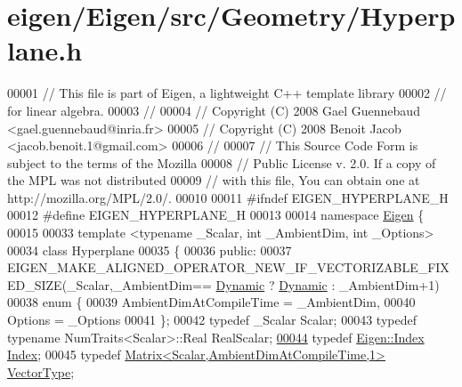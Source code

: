 \hypertarget{eigen_2_eigen_2src_2_geometry_2_hyperplane_8h_source}{}\section{eigen/\+Eigen/src/\+Geometry/\+Hyperplane.h}
\label{eigen_2_eigen_2src_2_geometry_2_hyperplane_8h_source}

\begin{DoxyCode}
00001 \textcolor{comment}{// This file is part of Eigen, a lightweight C++ template library}
00002 \textcolor{comment}{// for linear algebra.}
00003 \textcolor{comment}{//}
00004 \textcolor{comment}{// Copyright (C) 2008 Gael Guennebaud <gael.guennebaud@inria.fr>}
00005 \textcolor{comment}{// Copyright (C) 2008 Benoit Jacob <jacob.benoit.1@gmail.com>}
00006 \textcolor{comment}{//}
00007 \textcolor{comment}{// This Source Code Form is subject to the terms of the Mozilla}
00008 \textcolor{comment}{// Public License v. 2.0. If a copy of the MPL was not distributed}
00009 \textcolor{comment}{// with this file, You can obtain one at http://mozilla.org/MPL/2.0/.}
00010 
00011 \textcolor{preprocessor}{#ifndef EIGEN\_HYPERPLANE\_H}
00012 \textcolor{preprocessor}{#define EIGEN\_HYPERPLANE\_H}
00013 
00014 \textcolor{keyword}{namespace }\hyperlink{namespace_eigen}{Eigen} \{ 
00015 
00033 \textcolor{keyword}{template} <\textcolor{keyword}{typename} \_Scalar, \textcolor{keywordtype}{int} \_AmbientDim, \textcolor{keywordtype}{int} \_Options>
00034 \textcolor{keyword}{class }Hyperplane
00035 \{
00036 \textcolor{keyword}{public}:
00037   EIGEN\_MAKE\_ALIGNED\_OPERATOR\_NEW\_IF\_VECTORIZABLE\_FIXED\_SIZE(\_Scalar,\_AmbientDim==
      \hyperlink{namespace_eigen_ad81fa7195215a0ce30017dfac309f0b2}{Dynamic} ? \hyperlink{namespace_eigen_ad81fa7195215a0ce30017dfac309f0b2}{Dynamic} : \_AmbientDim+1)
00038   enum \{
00039     AmbientDimAtCompileTime = \_AmbientDim,
00040     Options = \_Options
00041   \};
00042   \textcolor{keyword}{typedef} \_Scalar Scalar;
00043   \textcolor{keyword}{typedef} \textcolor{keyword}{typename} NumTraits<Scalar>::Real RealScalar;
\hyperlink{group___geometry___module_a58d2307d16128a0026021374e9e10465}{00044}   \textcolor{keyword}{typedef} \hyperlink{namespace_eigen_a62e77e0933482dafde8fe197d9a2cfde}{Eigen::Index} \hyperlink{group___geometry___module_a58d2307d16128a0026021374e9e10465}{Index}; 
00045   \textcolor{keyword}{typedef} \hyperlink{group___core___module}{Matrix<Scalar,AmbientDimAtCompileTime,1>} 
      \hyperlink{group___core___module}{VectorType};

\end{DoxyCode}

